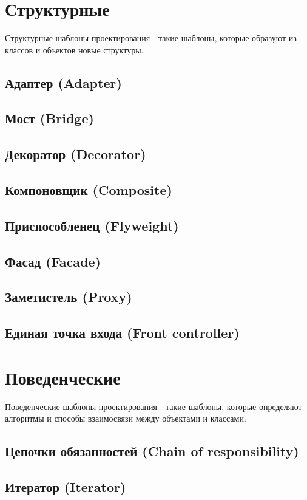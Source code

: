 \section{Структурные}

Структурные шаблоны проектирования - такие шаблоны, которые образуют из классов и объектов новые структуры.

\subsection{Адаптер (Adapter)}
\subsection{Мост (Bridge)}
\subsection{Декоратор (Decorator)}
\subsection{Компоновщик (Composite)}
\subsection{Приспособленец (Flyweight)}
\subsection{Фасад (Facade)}
\subsection{Заметистель (Proxy)}
\subsection{Единая точка входа (Front controller)}

\section{Поведенческие}

Поведенческие шаблоны проектирования - такие шаблоны, которые определяют алгоритмы и способы взаимосвязи между объектами и классами.

\subsection{Цепочки обязанностей (Chain of responsibility)}
\subsection{Итератор (Iterator)}
